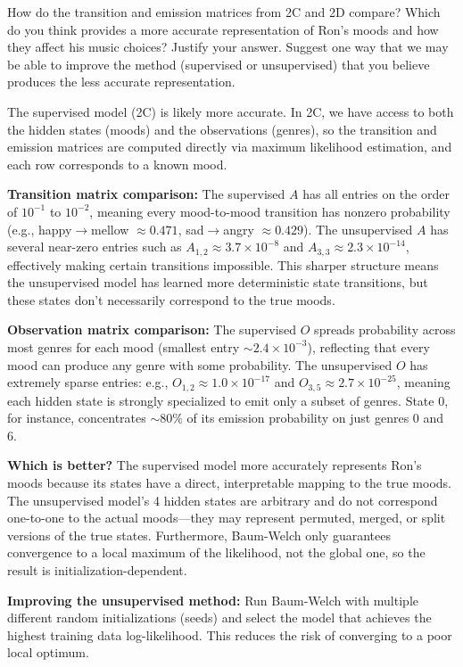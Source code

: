 \documentclass{article}
\begin{document}
\problem[5] How do the transition and emission matrices from 2C and 2D compare? Which do you think provides a more accurate representation of Ron's moods and how they affect his music choices? Justify your answer. Suggest one way that we may be able to improve the method (supervised or unsupervised) that you believe produces the less accurate representation.
\begin{subsolution}

The supervised model (2C) is likely more accurate. In 2C, we have access to both the hidden states (moods) and the observations (genres), so the transition and emission matrices are computed directly via maximum likelihood estimation, and each row corresponds to a known mood.

\textbf{Transition matrix comparison:} The supervised $A$ has all entries on the order of $10^{-1}$ to $10^{-2}$, meaning every mood-to-mood transition has nonzero probability (e.g., happy$\to$mellow $\approx 0.471$, sad$\to$angry $\approx 0.429$). The unsupervised $A$ has several near-zero entries such as $A_{1,2} \approx 3.7 \times 10^{-8}$ and $A_{3,3} \approx 2.3 \times 10^{-14}$, effectively making certain transitions impossible. This sharper structure means the unsupervised model has learned more deterministic state transitions, but these states don't necessarily correspond to the true moods.

\textbf{Observation matrix comparison:} The supervised $O$ spreads probability across most genres for each mood (smallest entry $\sim 2.4 \times 10^{-3}$), reflecting that every mood can produce any genre with some probability. The unsupervised $O$ has extremely sparse entries: e.g., $O_{1,2} \approx 1.0 \times 10^{-17}$ and $O_{3,5} \approx 2.7 \times 10^{-25}$, meaning each hidden state is strongly specialized to emit only a subset of genres. State 0, for instance, concentrates $\sim 80\%$ of its emission probability on just genres 0 and 6.

\textbf{Which is better?} The supervised model more accurately represents Ron's moods because its states have a direct, interpretable mapping to the true moods. The unsupervised model's 4 hidden states are arbitrary and do not correspond one-to-one to the actual moods---they may represent permuted, merged, or split versions of the true states. Furthermore, Baum-Welch only guarantees convergence to a local maximum of the likelihood, not the global one, so the result is initialization-dependent.

\textbf{Improving the unsupervised method:} Run Baum-Welch with multiple different random initializations (seeds) and select the model that achieves the highest training data log-likelihood. This reduces the risk of converging to a poor local optimum.

\end{subsolution}
\newpage
\end{document}
